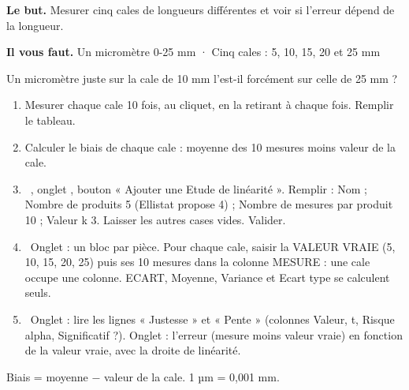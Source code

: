 \documentclass[10pt,a4paper]{article}
\begin{document}
\thispagestyle{fancy}
\begin{tcolorbox}[boite]\textbf{Le but.} Mesurer cinq cales de longueurs différentes et voir si l'erreur dépend de la longueur.\par\textbf{Il vous faut.} Un micromètre 0-25 mm · Cinq cales : 5, 10, 15, 20 et 25 mm\end{tcolorbox}
\begin{tcolorbox}[pred]Un micromètre juste sur la cale de 10 mm l'est-il forcément sur celle de 25 mm ?\reponse\end{tcolorbox}
\begin{enumerate}[label=\textcolor{cyan}{\textbf{\arabic*.}},leftmargin=15pt,itemsep=1.5pt]
\item Mesurer chaque cale 10 fois, au cliquet, en la retirant à chaque fois. Remplir le tableau.
\item Calculer le biais de chaque cale : moyenne des 10 mesures moins valeur de la cale.
\item \tagE\ , onglet , bouton « Ajouter une Etude de linéarité ». Remplir : Nom ; Nombre de produits 5 (Ellistat propose 4) ; Nombre de mesures par produit 10 ; Valeur k 3. Laisser les autres cases vides. Valider.
\item \tagE\ Onglet  : un bloc par pièce. Pour chaque cale, saisir la VALEUR VRAIE (5, 10, 15, 20, 25) puis ses 10 mesures dans la colonne MESURE : une cale occupe une colonne. ECART, Moyenne, Variance et Ecart type se calculent seuls.
\item \tagE\ Onglet  : lire les lignes « Justesse » et « Pente » (colonnes Valeur, t, Risque alpha, Significatif ?). Onglet  : l'erreur (mesure moins valeur vraie) en fonction de la valeur vraie, avec la droite de linéarité.
\end{enumerate}
\par{\small Biais = moyenne $-$ valeur de la cale. 1 µm = 0,001 mm.}\par
\end{document}

